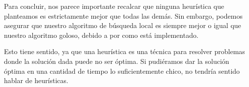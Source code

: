 Para concluir, nos parece importante recalcar que ninguna heurística que planteamos es estrictamente mejor que todas las demás. Sin embargo, podemos asegurar que nuestro algoritmo de búsqueda local es siempre mejor o igual que nuestro algoritmo goloso, debido a por como está implementado. 

Esto tiene sentido, ya que una heurística es una técnica para resolver problemas donde la solución dada puede no ser óptima. Si pudiéramos dar la solución óptima en una cantidad de tiempo lo suficientemente chico, no tendría sentido hablar de heurísticas.